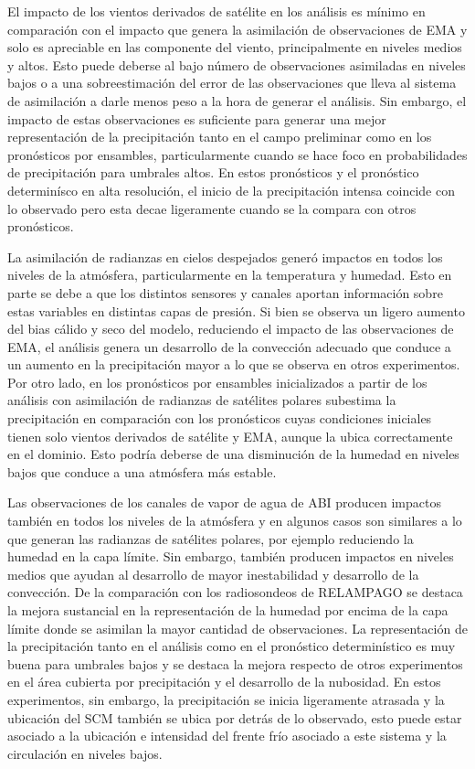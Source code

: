 \documentclass[12pt,oneside,a4paper]{reedthesis}
\begin{document}
El impacto de los vientos derivados de satélite en los análisis es mínimo en comparación con el impacto que genera la asimilación de observaciones de EMA y solo es apreciable en las componente del viento, principalmente en niveles medios y altos. Esto puede deberse al bajo número de observaciones asimiladas en niveles bajos o a una sobreestimación del error de las observaciones que lleva al sistema de asimilación a darle menos peso a la hora de generar el análisis. Sin embargo, el impacto de estas observaciones es suficiente para generar una mejor representación de la precipitación tanto en el campo preliminar como en los pronósticos por ensambles, particularmente cuando se hace foco en probabilidades de precipitación para umbrales altos. En estos pronósticos y el pronóstico determinísco en alta resolución, el inicio de la precipitación intensa coincide con lo observado pero esta decae ligeramente cuando se la compara con otros pronósticos.

La asimilación de radianzas en cielos despejados generó impactos en todos los niveles de la atmósfera, particularmente en la temperatura y humedad. Esto en parte se debe a que los distintos sensores y canales aportan información sobre estas variables en distintas capas de presión. Si bien se observa un ligero aumento del bias cálido y seco del modelo, reduciendo el impacto de las observaciones de EMA, el análisis genera un desarrollo de la convección adecuado que conduce a un aumento en la precipitación mayor a lo que se observa en otros experimentos. Por otro lado, en los pronósticos por ensambles inicializados a partir de los análisis con asimilación de radianzas de satélites polares subestima la precipitación en comparación con los pronósticos cuyas condiciones iniciales tienen solo vientos derivados de satélite y EMA, aunque la ubica correctamente en el dominio. Esto podría deberse de una disminución de la humedad en niveles bajos que conduce a una atmósfera más estable.

Las observaciones de los canales de vapor de agua de ABI producen impactos también en todos los niveles de la atmósfera y en algunos casos son similares a lo que generan las radianzas de satélites polares, por ejemplo reduciendo la humedad en la capa límite. Sin embargo, también producen impactos en niveles medios que ayudan al desarrollo de mayor inestabilidad y desarrollo de la convección. De la comparación con los radiosondeos de RELAMPAGO se destaca la mejora sustancial en la representación de la humedad por encima de la capa límite donde se asimilan la mayor cantidad de observaciones. La representación de la precipitación tanto en el análisis como en el pronóstico determinístico es muy buena para umbrales bajos y se destaca la mejora respecto de otros experimentos en el área cubierta por precipitación y el desarrollo de la nubosidad. En estos experimentos, sin embargo, la precipitación se inicia ligeramente atrasada y la ubicación del SCM también se ubica por detrás de lo observado, esto puede estar asociado a la ubicación e intensidad del frente frío asociado a este sistema y la circulación en niveles bajos.
\end{document}
